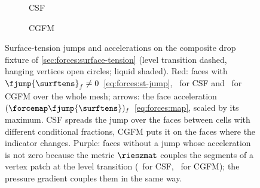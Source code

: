 \begin{figure}
\begin{subfigure}[b]{0.495\textwidth}
    \caption{CSF}
    \label{fig:forces:jumps:csf}
  \end{subfigure}\hfill
  \begin{subfigure}[b]{0.495\textwidth}
    \centering
    \caption{CGFM}
    \label{fig:forces:jumps:cgfm}
  \end{subfigure}
  \caption{Surface-tension jumps and accelerations on the composite drop
    fixture of \cref{sec:forces:surface-tension} (level transition dashed,
    hanging vertices open circles; liquid shaded). Red: faces with
    $\fjump{\surftens}_f\neq0$~\cref{eq:forces:st-jump}, \chkForceCsfFaces\
    for CSF and \chkForceCgfmFaces\ for CGFM over the whole mesh; arrows: the
    face acceleration $(\forcemap\fjump{\surftens})_f$~\cref{eq:forces:map},
    scaled by its maximum. CSF spreads the jump over the faces between cells
    with different conditional fractions, CGFM puts it on the faces where the
    indicator changes. Purple: faces without a jump whose acceleration is not
    zero because the metric $\rieszmat$ couples the segments of a vertex patch
    at the level transition (\chkForceCsfCoupled\ for CSF, \chkForceCgfmCoupled\
    for CGFM); the pressure gradient couples them in the same way.}
  \label{fig:forces:jumps}
\end{figure}
